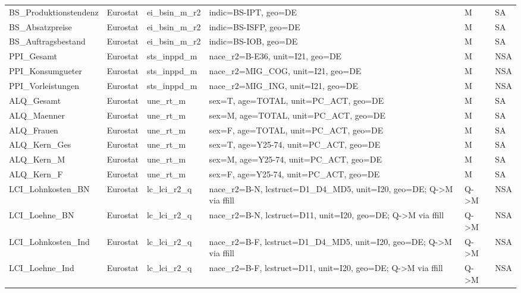 \begin{table}
\begin{tabular}{llllll}
BS\_Produktionstendenz & Eurostat & ei\_bsin\_m\_r2 & indic=BS-IPT, geo=DE & M & SA \\
BS\_Absatzpreise & Eurostat & ei\_bsin\_m\_r2 & indic=BS-ISFP, geo=DE & M & SA \\
BS\_Auftragsbestand & Eurostat & ei\_bsin\_m\_r2 & indic=BS-IOB, geo=DE & M & SA \\
PPI\_Gesamt & Eurostat & sts\_inppd\_m & nace\_r2=B-E36, unit=I21, geo=DE & M & NSA \\
PPI\_Konsumgueter & Eurostat & sts\_inppd\_m & nace\_r2=MIG\_COG, unit=I21, geo=DE & M & NSA \\
PPI\_Vorleistungen & Eurostat & sts\_inppd\_m & nace\_r2=MIG\_ING, unit=I21, geo=DE & M & NSA \\
ALQ\_Gesamt & Eurostat & une\_rt\_m & sex=T, age=TOTAL, unit=PC\_ACT, geo=DE & M & SA \\
ALQ\_Maenner & Eurostat & une\_rt\_m & sex=M, age=TOTAL, unit=PC\_ACT, geo=DE & M & SA \\
ALQ\_Frauen & Eurostat & une\_rt\_m & sex=F, age=TOTAL, unit=PC\_ACT, geo=DE & M & SA \\
ALQ\_Kern\_Ges & Eurostat & une\_rt\_m & sex=T, age=Y25-74, unit=PC\_ACT, geo=DE & M & SA \\
ALQ\_Kern\_M & Eurostat & une\_rt\_m & sex=M, age=Y25-74, unit=PC\_ACT, geo=DE & M & SA \\
ALQ\_Kern\_F & Eurostat & une\_rt\_m & sex=F, age=Y25-74, unit=PC\_ACT, geo=DE & M & SA \\
LCI\_Lohnkosten\_BN & Eurostat & lc\_lci\_r2\_q & nace\_r2=B-N, lcstruct=D1\_D4\_MD5, unit=I20, geo=DE; Q->M via ffill & Q->M & NSA \\
LCI\_Loehne\_BN & Eurostat & lc\_lci\_r2\_q & nace\_r2=B-N, lcstruct=D11, unit=I20, geo=DE; Q->M via ffill & Q->M & NSA \\
LCI\_Lohnkosten\_Ind & Eurostat & lc\_lci\_r2\_q & nace\_r2=B-F, lcstruct=D1\_D4\_MD5, unit=I20, geo=DE; Q->M via ffill & Q->M & NSA \\
LCI\_Loehne\_Ind & Eurostat & lc\_lci\_r2\_q & nace\_r2=B-F, lcstruct=D11, unit=I20, geo=DE; Q->M via ffill & Q->M & NSA \\
\bottomrule
\end{tabular}
\end{table}
